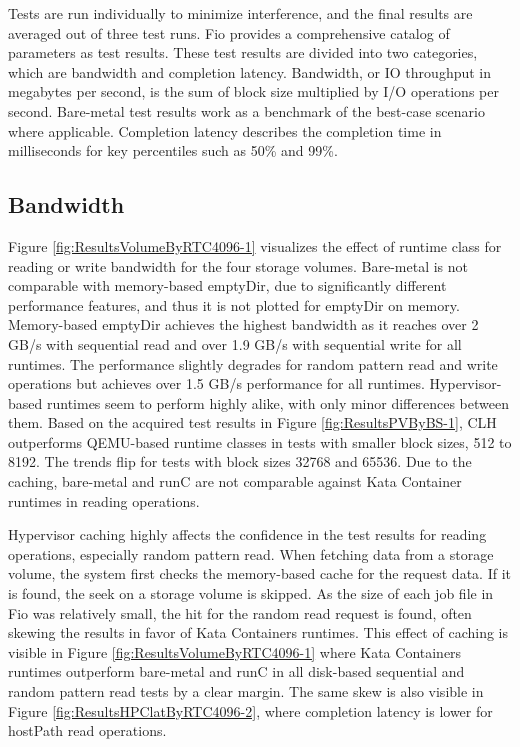 Tests are run individually to minimize interference, and the final results are averaged out of three test runs. Fio provides a comprehensive catalog of parameters as test results. These test results are divided into two categories, which are bandwidth and completion latency. Bandwidth, or IO throughput in megabytes per second, is the sum of block size multiplied by I/O operations per second. Bare-metal test results work as a benchmark of the best-case scenario where applicable. Completion latency describes the completion time in milliseconds for key percentiles such as 50\% and 99\%. 

\subsection{Bandwidth}

Figure \ref{fig:ResultsVolumeByRTC4096-1} visualizes the effect of runtime class for reading or write bandwidth for the four storage volumes. Bare-metal is not comparable with memory-based emptyDir, due to significantly different performance features, and thus it is not plotted for emptyDir on memory. Memory-based emptyDir achieves the highest bandwidth as it reaches over 2 GB/s with sequential read and over 1.9 GB/s with sequential write for all runtimes. The performance slightly degrades for random pattern read and write operations but achieves over 1.5 GB/s performance for all runtimes. Hypervisor-based runtimes seem to perform highly alike, with only minor differences between them. Based on the acquired test results in Figure \ref{fig:ResultsPVByBS-1}, CLH outperforms QEMU-based runtime classes in tests with smaller block sizes, 512 to 8192. The trends flip for tests with block sizes 32768 and 65536. Due to the caching, bare-metal and runC are not comparable against Kata Container runtimes in reading operations.

Hypervisor caching highly affects the confidence in the test results for reading operations, especially random pattern read. When fetching data from a storage volume, the system first checks the memory-based cache for the request data. If it is found, the seek on a storage volume is skipped. As the size of each job file in Fio was relatively small, the hit for the random read request is found, often skewing the results in favor of Kata Containers runtimes. This effect of caching is visible in Figure \ref{fig:ResultsVolumeByRTC4096-1} where Kata Containers runtimes outperform bare-metal and runC in all disk-based sequential and random pattern read tests by a clear margin. The same skew is also visible in Figure \ref{fig:ResultsHPClatByRTC4096-2}, where completion latency is lower for hostPath read operations.



